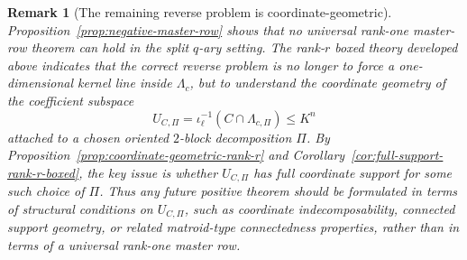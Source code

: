 \documentclass[12pt]{article}
\newtheorem{remark}[theorem]{Remark}
\begin{document}
\begin{remark}[The remaining reverse problem is coordinate-geometric]
\rm
Proposition~\ref{prop:negative-master-row} shows that no universal rank-one master-row theorem can hold in the split \(q\)-ary setting. The rank-\(r\) boxed theory developed above indicates that the correct reverse problem is no longer to force a one-dimensional kernel line inside \(\Lambda_c\), but to understand the coordinate geometry of the coefficient subspace
\[
U_{C,\Pi}=\iota_\ell^{-1}(C\cap \Lambda_{c,\Pi})\le K^n
\]
attached to a chosen oriented \(2\)-block decomposition \(\Pi\). By Proposition~\ref{prop:coordinate-geometric-rank-r} and Corollary~\ref{cor:full-support-rank-r-boxed}, the key issue is whether \(U_{C,\Pi}\) has full coordinate support for some such choice of \(\Pi\). Thus any future positive theorem should be formulated in terms of structural conditions on \(U_{C,\Pi}\), such as coordinate indecomposability, connected support geometry, or related matroid-type connectedness properties, rather than in terms of a universal rank-one master row.
\end{remark}
\end{document}
